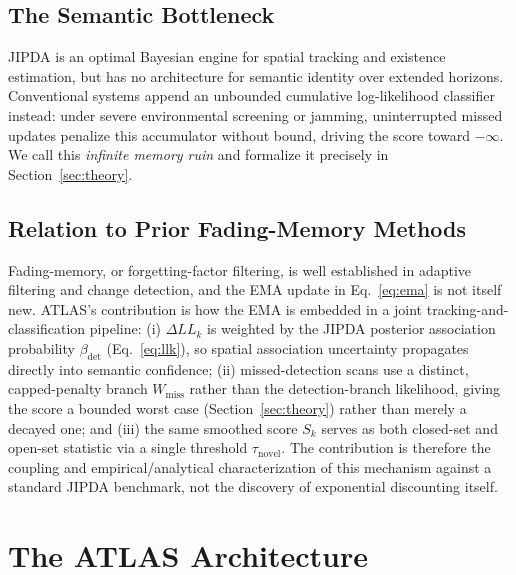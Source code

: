 \documentclass[conference]{IEEEtran}
\begin{document}
\subsection{The Semantic Bottleneck}
\label{sec:bottleneck}
JIPDA is an optimal Bayesian engine for spatial tracking and existence estimation, but has no architecture for semantic identity over extended horizons. Conventional systems append an unbounded cumulative log-likelihood classifier instead: under severe environmental screening or jamming, uninterrupted missed updates penalize this accumulator without bound, driving the score toward $-\infty$. We call this \emph{infinite memory ruin} and formalize it precisely in Section~\ref{sec:theory}.

\subsection{Relation to Prior Fading-Memory Methods}
\label{sec:relation}
Fading-memory, or forgetting-factor filtering, is well established in adaptive filtering and change detection, and the EMA update in Eq.~\eqref{eq:ema} is not itself new. ATLAS's contribution is how the EMA is embedded in a joint tracking-and-classification pipeline: (i) $\Delta LL_k$ is weighted by the JIPDA posterior association probability $\beta_{\text{det}}$ (Eq.~\eqref{eq:llk}), so spatial association uncertainty propagates directly into semantic confidence; (ii) missed-detection scans use a distinct, capped-penalty branch $W_{\text{miss}}$ rather than the detection-branch likelihood, giving the score a bounded worst case (Section~\ref{sec:theory}) rather than merely a decayed one; and (iii) the same smoothed score $S_k$ serves as both closed-set and open-set statistic via a single threshold $\tau_{\text{novel}}$. The contribution is therefore the coupling and empirical/analytical characterization of this mechanism against a standard JIPDA benchmark, not the discovery of exponential discounting itself.

\section{The ATLAS Architecture}
\end{document}
